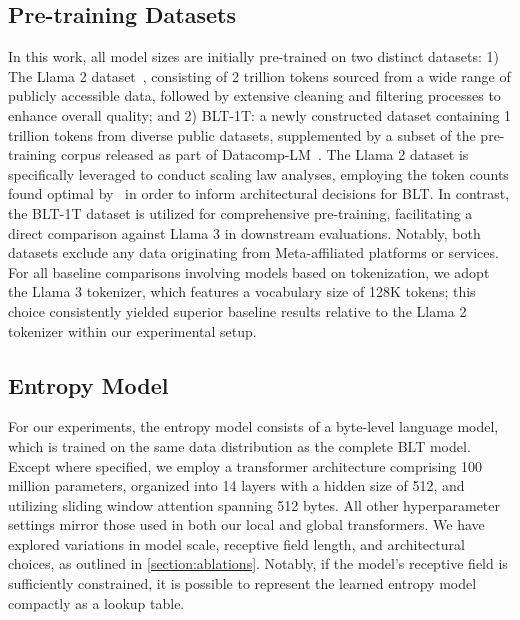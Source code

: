 \subsection{Pre-training Datasets} In this work, all model sizes are initially pre-trained on two distinct datasets: 1) The Llama 2 dataset~\citep{touvron2023llama}, consisting of 2 trillion tokens sourced from a wide range of publicly accessible data, followed by extensive cleaning and filtering processes to enhance overall quality; and 2) {\textsc BLT}-1T: a newly constructed dataset containing 1 trillion tokens from diverse public datasets, supplemented by a subset of the pre-training corpus released as part of Datacomp-LM~\citep{li2024datacomp}. The Llama 2 dataset is specifically leveraged to conduct scaling law analyses, employing the token counts found optimal by~\cite{dubey2024llama} in order to inform architectural decisions for {\textsc BLT}. In contrast, the {\textsc BLT}-1T dataset is utilized for comprehensive pre-training, facilitating a direct comparison against Llama 3 in downstream evaluations. Notably, both datasets exclude any data originating from Meta-affiliated platforms or services. For all baseline comparisons involving models based on tokenization, we adopt the Llama 3 tokenizer, which features a vocabulary size of 128K tokens; this choice consistently yielded superior baseline results relative to the Llama 2 tokenizer within our experimental setup.

\subsection{Entropy Model}  
For our experiments, the entropy model consists of a byte-level language model, which is trained on the same data distribution as the complete {\textsc BLT} model. Except where specified, we employ a transformer architecture comprising 100 million parameters, organized into 14 layers with a hidden size of 512, and utilizing sliding window attention spanning 512 bytes. All other hyperparameter settings mirror those used in both our local and global transformers. We have explored variations in model scale, receptive field length, and architectural choices, as outlined in \autoref{section:ablations}. Notably, if the model's receptive field is sufficiently constrained, it is possible to represent the learned entropy model compactly as a lookup table.

